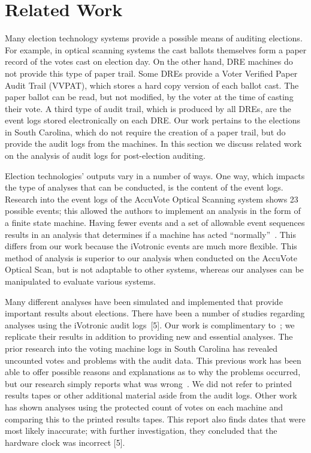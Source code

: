 \documentclass[letterpaper,twocolumn,10pt]{article}
\begin{document}
\section{Related Work}
Many election technology systems provide a possible means of auditing elections. For example, in optical scanning systems the cast ballots themselves form a paper record of the votes cast on election day. On the other hand, DRE machines do not provide this type of paper trail. Some DREs provide a Voter Verified Paper Audit Trail (VVPAT), which stores a hard copy version of each ballot cast. The paper ballot can be read, but not modified, by the voter at the time of casting their vote. A third type of audit trail, which is produced by all DREs, are the event logs stored electronically on each DRE. Our work pertains to the elections in South Carolina, which do not require the creation of a paper trail, but do provide the audit logs from the machines. In this section we discuss related work on the analysis of audit logs for post-election auditing.

Election technologies’ outputs vary in a number of ways.  One way, which impacts the type of analyses that can be conducted, is the content of the event logs.  Research into the event logs of the AccuVote Optical Scanning system shows 23 possible events; this allowed the authors to implement an analysis in the form of a finite state machine.  Having fewer events and a set of allowable event sequences results in an analysis that determines if a machine has acted “normally”~\cite{Antonyan2009}.  This differs from our work because the iVotronic events are much more flexible.  This method of analysis is superior to our analysis when conducted on the AccuVote Optical Scan, but is not adaptable to other systems, whereas our analyses can be manipulated to evaluate various systems.

Many different analyses have been simulated and implemented that provide important results about elections.  There have been a number of studies regarding analyses using the iVotronic audit logs~\cite{Buell2011}[5].  Our work is complimentary to~\cite{Buell2011}; we replicate their results in addition to providing new and essential analyses.  The prior research into the voting machine logs in South Carolina has revealed uncounted votes and problems with the audit data.  This previous work has been able to offer possible reasons and explanations as to why the problems occurred, but our research simply reports what was wrong~\cite{Buell2011}.  We did not refer to printed results tapes or other additional material aside from the audit logs.  Other work has shown analyses using the protected count of votes on each machine and comparing this to the printed results tapes.  This report also finds dates that were most likely inaccurate; with further investigation, they concluded that the hardware clock was incorrect [5].
\end{document}
